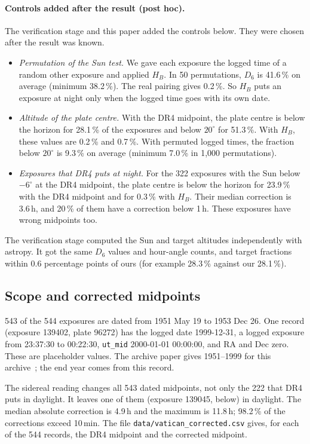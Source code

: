 \documentclass[11pt]{article}
\begin{document}
\paragraph{Controls added after the result (post hoc).} The verification stage and this paper added the controls below. They were chosen after the result was known.
\begin{itemize}
\item \emph{Permutation of the Sun test.} We gave each exposure the logged time of a random other exposure and applied $H_B$. In 50 permutations, $D_6$ is 41.6\,\% on average (minimum 38.2\,\%). The real pairing gives 0.2\,\%. So $H_B$ puts an exposure at night only when the logged time goes with its own date.
\item \emph{Altitude of the plate centre.} With the DR4 midpoint, the plate centre is below the horizon for 28.1\,\% of the exposures and below $20^\circ$ for 51.3\,\%. With $H_B$, these values are 0.2\,\% and 0.7\,\%. With permuted logged times, the fraction below $20^\circ$ is 9.3\,\% on average (minimum 7.0\,\% in 1{,}000 permutations).
\item \emph{Exposures that DR4 puts at night.} For the 322 exposures with the Sun below $-6^\circ$ at the DR4 midpoint, the plate centre is below the horizon for 23.9\,\% with the DR4 midpoint and for 0.3\,\% with $H_B$. Their median correction is 3.6\,h, and 20\,\% of them have a correction below 1\,h. These exposures have wrong midpoints too.
\end{itemize}
The verification stage computed the Sun and target altitudes independently with astropy. It got the same $D_6$ values and hour-angle counts, and target fractions within 0.6 percentage points of ours (for example 28.3\,\% against our 28.1\,\%).

\subsection{Scope and corrected midpoints}
543 of the 544 exposures are dated from 1951 May 19 to 1953 Dec 26. One record (exposure 139402, plate 96272) has the logged date 1999-12-31, a logged exposure from 23:37:30 to 00:22:30, \texttt{ut\_mid} 2000-01-01 00:00:00, and RA and Dec zero. These are placeholder values. The archive paper gives 1951--1999 for this archive~\cite{enke2024}; the end year comes from this record.

The sidereal reading changes all 543 dated midpoints, not only the 222 that DR4 puts in daylight. It leaves one of them (exposure 139045, below) in daylight. The median absolute correction is 4.9\,h and the maximum is 11.8\,h; 98.2\,\% of the corrections exceed 10\,min. The file \texttt{data/vatican\_corrected.csv} gives, for each of the 544 records, the DR4 midpoint and the corrected midpoint.
\end{document}
